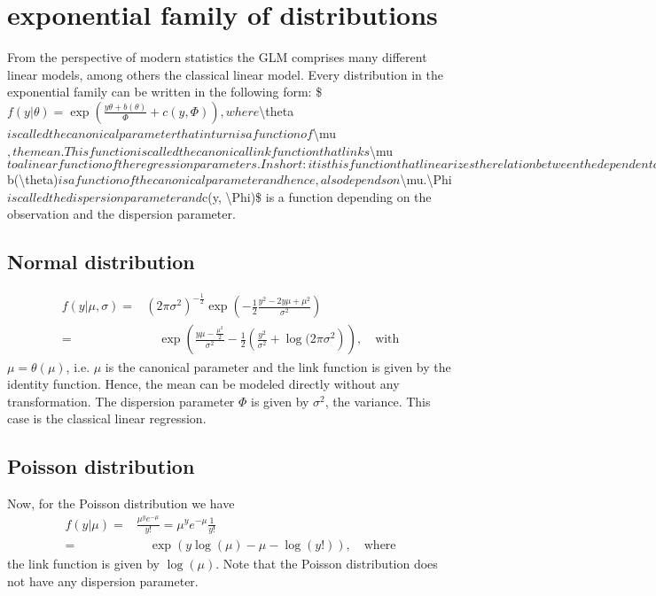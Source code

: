 \documentclass[letterpaper,10pt,english]{jupyterBook}
\begin{document}
\section{exponential family of distributions}
\label{\detokenize{Regression_Techniques:exponential-family-of-distributions}}
\sphinxAtStartPar
From the perspective of modern statistics the GLM comprises many
different linear models, among others the classical linear model. Every
distribution in the exponential family can be written in the following
form:
\$\(f(y| \theta) = \exp\left(\frac{y \theta + b(\theta)}{\Phi} + c(y, \Phi)\right),\)\(
where \)\textbackslash{}theta\( is called the canonical parameter that in turn is a
function of \)\textbackslash{}mu\(, the mean. This function is called the canonical link
function that links \)\textbackslash{}mu\( to a linear function of the regression
parameters. In short: it is this function that linearizes the relation
between the dependent and the independent variables. For the sake of
completeness: \)b(\textbackslash{}theta)\( is a function of the canonical parameter and
hence, also depends on \)\textbackslash{}mu\(. \)\textbackslash{}Phi\( is called the dispersion parameter
and \)c(y, \textbackslash{}Phi)\$ is a function depending on the observation and the
dispersion parameter.


\subsection{Normal distribution}
\label{\detokenize{Regression_Techniques:normal-distribution}}\begin{eqnarray*}
f(y| \mu, \sigma) =& (2\pi \sigma^2)^{-\frac{1}{2}} \exp\left(-\frac{1}{2}\frac{y^2 -2y\mu + \mu^2}{\sigma^2}\right) \\
 =&\quad \exp \left(\frac{y\mu -\frac{\mu^2}{2}}{\sigma^2} - \frac{1}{2}\left(\frac{y^2}{\sigma^2} + \log(2\pi\sigma^2\right)\right),\quad \text{with}
\end{eqnarray*}
\sphinxAtStartPar
\(\mu = \theta(\mu)\), i.e. \(\mu\) is the canonical parameter and the link
function is given by the identity function. Hence, the mean can be
modeled directly without any transformation. The dispersion parameter \(\Phi\) is given by \(\sigma^2\), the variance. This case is the classical
linear regression.


\subsection{Poisson distribution}
\label{\detokenize{Regression_Techniques:poisson-distribution}}
\sphinxAtStartPar
Now, for the Poisson distribution we have
\begin{eqnarray*}
f(y| \mu) =& \frac{\mu^{y} e^{-\mu}}{y!} = \mu^y e^{-\mu}\frac{1}{y!}\\
=& \quad\exp\left(y \log(\mu) - \mu - \log(y!)\right), \quad\text{where}
\end{eqnarray*}
\sphinxAtStartPar
the link function is given by \(\log(\mu)\). Note that the Poisson
distribution does not have any dispersion parameter.
\end{document}
